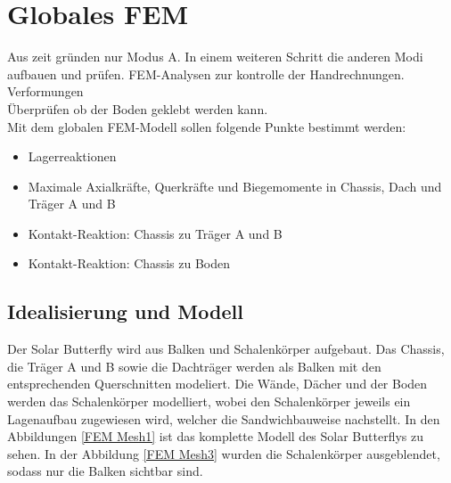 \section{Globales FEM}



Aus zeit gründen nur Modus A. In einem weiteren Schritt die anderen Modi aufbauen und prüfen.
FEM-Analysen zur kontrolle der Handrechnungen.\\
Verformungen\\
Überprüfen ob der Boden geklebt werden kann.\\

Mit dem globalen FEM-Modell sollen folgende Punkte bestimmt werden:
\begin{itemize}
  \item Lagerreaktionen
  \item Maximale Axialkräfte, Querkräfte und Biegemomente in Chassis, Dach und Träger A und B
  \item Kontakt-Reaktion: Chassis zu Träger A und B
  \item Kontakt-Reaktion: Chassis zu Boden
\end{itemize}




\subsection{Idealisierung und Modell}
Der Solar Butterfly wird aus Balken und Schalenkörper aufgebaut. Das Chassis, die Träger A und B sowie die Dachträger werden als Balken mit den entsprechenden Querschnitten modeliert. Die Wände, Dächer und der Boden werden das Schalenkörper modelliert, wobei den Schalenkörper jeweils ein Lagenaufbau zugewiesen wird, welcher die Sandwichbauweise nachstellt. In den Abbildungen \ref{FEM Mesh1} ist das komplette Modell des Solar Butterflys zu sehen. In der Abbildung \ref{FEM Mesh3} wurden die Schalenkörper ausgeblendet, sodass nur die Balken sichtbar sind.

